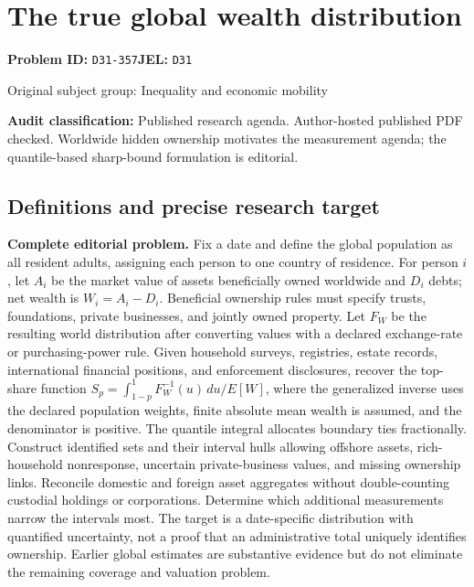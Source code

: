 \documentclass[11pt,a4paper]{article}
\begin{document}
\section*{The true global wealth distribution}
\textbf{Problem ID:} \texttt{D31-357}\quad \textbf{JEL:} \texttt{D31}\par
\label{problem:OP-0361}
{\sffamily\small\color{muted}Original subject group: Inequality and economic mobility\par}
\label{definitions:problem:30007643}
\textbf{Audit classification:} Published research agenda. Author-hosted published PDF checked. Worldwide hidden ownership motivates the measurement agenda; the quantile-based sharp-bound formulation is editorial.
\subsection*{Definitions and precise research target}
\textbf{Complete editorial problem.} Fix a date and define the global population as all resident adults, assigning each person to one country of residence. For person \(i\), let \(A_i\) be the market value of assets beneficially owned worldwide and \(D_i\) debts; net wealth is \(W_i=A_i-D_i\). Beneficial ownership rules must specify trusts, foundations, private businesses, and jointly owned property. Let \(F_W\) be the resulting world distribution after converting values with a declared exchange-rate or purchasing-power rule. Given household surveys, registries, estate records, international financial positions, and enforcement disclosures, recover the top-share function \(S_p=\int_{1-p}^{1}F_W^{-1}(u)\,du/E[W]\), where the generalized inverse uses the declared population weights, finite absolute mean wealth is assumed, and the denominator is positive. The quantile integral allocates boundary ties fractionally. Construct identified sets and their interval hulls allowing offshore assets, rich-household nonresponse, uncertain private-business values, and missing ownership links. Reconcile domestic and foreign asset aggregates without double-counting custodial holdings or corporations. Determine which additional measurements narrow the intervals most. The target is a date-specific distribution with quantified uncertainty, not a proof that an administrative total uniquely identifies ownership. Earlier global estimates are substantive evidence but do not eliminate the remaining coverage and valuation problem.
\end{document}
